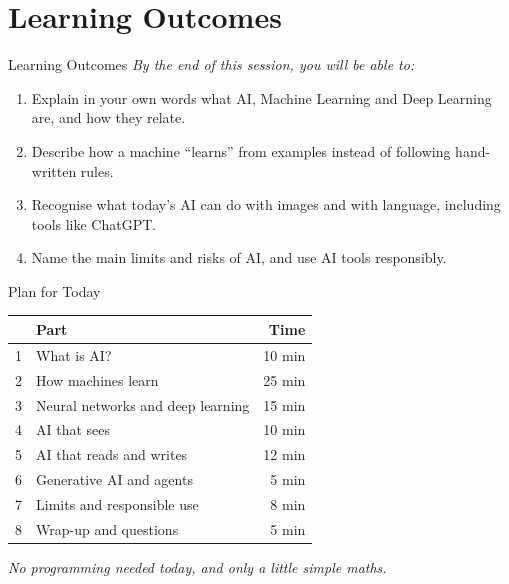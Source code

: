\section{Learning Outcomes}
\begin{frame}{Learning Outcomes}
    \vspace{0.5em}
    \textit{By the end of this session, you will be able to:}

    \vspace{1em}
    \begin{enumerate}
        \setlength\itemsep{1.2em}

        \item Explain in your own words what AI, Machine Learning and Deep Learning are, and how they relate.

        \item Describe how a machine ``learns'' from examples instead of following hand-written rules.

        \item Recognise what today's AI can do with images and with language, including tools like ChatGPT.

        \item Name the main limits and risks of AI, and use AI tools responsibly.
    \end{enumerate}
\end{frame}

\begin{frame}{Plan for Today}
    \centering
    \renewcommand{\arraystretch}{1.35}
    \begin{tabular}{clr}
        \toprule
        & \textbf{Part} & \textbf{Time} \\
        \midrule
        1 & What is AI? & 10 min \\
        2 & How machines learn & 25 min \\
        3 & Neural networks and deep learning & 15 min \\
        4 & AI that sees & 10 min \\
        5 & AI that reads and writes & 12 min \\
        6 & Generative AI and agents & 5 min \\
        7 & Limits and responsible use & 8 min \\
        8 & Wrap-up and questions & 5 min \\
        \bottomrule
    \end{tabular}

    \vspace{1em}
    \textit{No programming needed today, and only a little simple maths.}
\end{frame}
